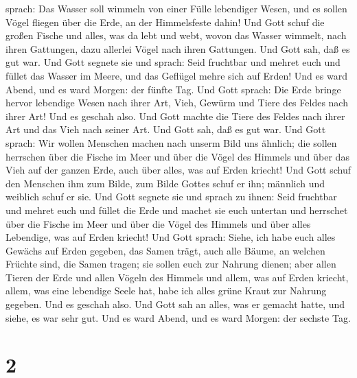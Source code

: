 sprach: Das Wasser soll wimmeln von einer Fülle lebendiger Wesen, und es
sollen Vögel fliegen über die Erde, an der Himmelsfeste dahin!
 Und Gott schuf die großen Fische und alles, was da lebt
und webt, wovon das Wasser wimmelt, nach ihren Gattungen, dazu allerlei
Vögel nach ihren Gattungen. Und Gott sah, daß es gut war.
 Und Gott segnete sie und sprach: Seid fruchtbar und
mehret euch und füllet das Wasser im Meere, und das Geflügel mehre sich
auf Erden!  Und es ward Abend, und es ward Morgen: der
fünfte Tag.  Und Gott sprach: Die Erde bringe hervor
lebendige Wesen nach ihrer Art, Vieh, Gewürm und Tiere des Feldes nach
ihrer Art! Und es geschah also.  Und Gott machte die
Tiere des Feldes nach ihrer Art und das Vieh nach seiner Art. Und Gott
sah, daß es gut war.  Und Gott sprach: Wir wollen
Menschen machen nach unserm Bild uns ähnlich; die sollen herrschen über
die Fische im Meer und über die Vögel des Himmels und über das Vieh auf
der ganzen Erde, auch über alles, was auf Erden kriecht! 
Und Gott schuf den Menschen ihm zum Bilde, zum Bilde Gottes schuf er
ihn; männlich und weiblich schuf er sie.  Und Gott
segnete sie und sprach zu ihnen: Seid fruchtbar und mehret euch und
füllet die Erde und machet sie euch untertan und herrschet über die
Fische im Meer und über die Vögel des Himmels und über alles Lebendige,
was auf Erden kriecht!  Und Gott sprach: Siehe, ich habe
euch alles Gewächs auf Erden gegeben, das Samen trägt, auch alle Bäume,
an welchen Früchte sind, die Samen tragen; sie sollen euch zur Nahrung
dienen;  aber allen Tieren der Erde und allen Vögeln des
Himmels und allem, was auf Erden kriecht, allem, was eine lebendige
Seele hat, habe ich alles grüne Kraut zur Nahrung gegeben. Und es
geschah also.  Und Gott sah an alles, was er gemacht
hatte, und siehe, es war sehr gut. Und es ward Abend, und es ward
Morgen: der sechste Tag.

\hypertarget{section-1}{%
\section{2}\label{section-1}}

